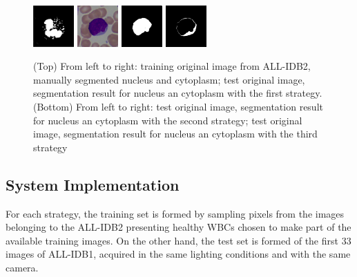 \documentclass[final,a4paper,12pt,english]{UnicaPhdThesis3}
\begin{document}
\begin{figure}[h]
	\includegraphics[width=0.14\textwidth]{images/2015_1_caip/2-4}
	\includegraphics[width=0.14\textwidth]{images/2015_1_caip/4-1}
	\includegraphics[width=0.14\textwidth]{images/2015_1_caip/4-2}
	\includegraphics[width=0.14\textwidth]{images/2015_1_caip/4-3}
	\caption{\label{fig:exs1} (Top) From left to right: training original image from ALL-IDB2, manually segmented nucleus and cytoplasm; test original image, segmentation result for nucleus an cytoplasm with the first strategy. (Bottom) From left to right: test original image, segmentation result for nucleus an cytoplasm with the second strategy; test original image, segmentation result for nucleus an cytoplasm with the third strategy}
\end{figure}

\subsection{System Implementation}
For each strategy, the training set is formed by sampling pixels from the images belonging to the ALL-IDB2 presenting healthy WBCs chosen to make part of the available training images. On the other hand, the test set is formed of the first 33 images of ALL-IDB1, acquired in the same lighting conditions and with the same camera. 
\end{document}
